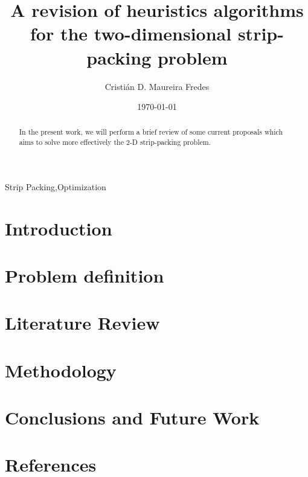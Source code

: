 \documentclass[preprint,authoryear,12pt]{elsarticle}
\begin{document}
\begin{frontmatter}

\title{A revision of heuristics algorithms for the two-dimensional strip-packing problem}
\author[utfsm]{Cristián D. Maureira Fredes}


\address[utfsm]{Departamento de Informática, Universidad Técnica Federico Santa María, Av. España 1680, Valparaiso, Chile}
\date{\today}

\begin{abstract}
In the present work,
we will perform a brief review of some current proposals
which aims to solve more effectively the 2-D strip-packing problem.
\end{abstract}

\begin{keyword}
Strip Packing\sep Optimization
\end{keyword}

\end{frontmatter}

\section{Introduction}
\label{introduction}


\section{Problem definition}
\label{problem}


\section{Literature Review}
\label{stateofart}


\section{Methodology}
\label{methodology}


\section{Conclusions and Future Work}
\label{conclusions}


\section*{References}
%


\end{document}
